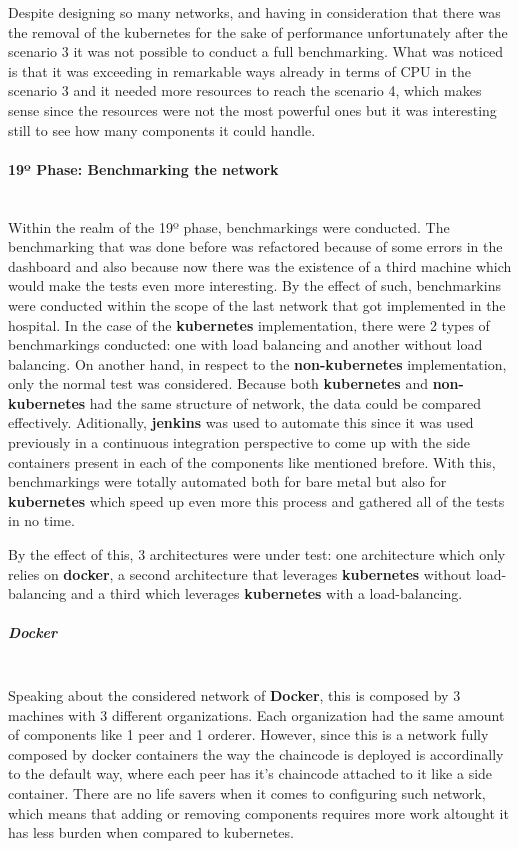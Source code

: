 Despite designing so many networks, and having in consideration that there was the removal of the kubernetes for the sake of performance unfortunately after the scenario 3 it was not possible to conduct a full benchmarking. What was noticed is that it was exceeding in remarkable ways already in terms of CPU in the scenario 3 and it needed more resources to reach the scenario 4, which makes sense since the resources were not the most powerful ones but it was interesting still to see how many components it could handle.

\paragraph{19º Phase: Benchmarking the network}\mbox{}\\
Within the realm of the 19º phase, benchmarkings were conducted. The benchmarking that was done before was refactored because of some errors in the dashboard and also because now there was the existence of a third machine which would make the tests even more interesting. By the effect of such, benchmarkins were conducted within the scope of the last network that got implemented in the hospital. In the case of the \textbf{kubernetes} implementation, there were 2 types of benchmarkings conducted: one with load balancing and another without load balancing. On another hand, in respect to the \textbf{non-kubernetes} implementation, only the normal test was considered. Because both \textbf{kubernetes} and \textbf{non-kubernetes} had the same structure of network, the data could be compared effectively. Aditionally, \textbf{jenkins} was used to automate this since it was used previously in a continuous integration perspective to come up with the side containers present in each of the components like mentioned brefore. With this, benchmarkings were totally automated both for bare metal but also for \textbf{kubernetes} which speed up even more this process and gathered all of the tests in no time.

By the effect of this, 3 architectures were under test: one architecture which only relies on \textbf{docker}, a second architecture that leverages \textbf{kubernetes} without load-balancing and a third which leverages \textbf{kubernetes} with a load-balancing.

\subparagraph{Docker} \mbox{}\\
Speaking about the considered network of \textbf{Docker}, this is composed by 3 machines with 3 different organizations. Each organization had the same amount of components like 1 peer and 1 orderer. However, since this is a network fully composed by docker containers the way the chaincode is deployed is accordinally to the default way, where each peer has it's chaincode attached to it like a side container. There are no life savers when it comes to configuring such network, which means that adding or removing components requires more work altought it has less burden when compared to kubernetes.

